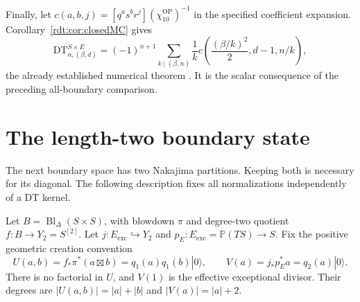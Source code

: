 Finally, let
$c(a,b,j)=[q^as^br^j](\chi_{10}^{\mathrm{OP}})^{-1}$ in the
specified coefficient expansion. Corollary~\ref{rdt:cor:closedMC}
gives
\[
 \mathrm{DT}^{S\times E}_{n,(\beta,d)}
 =(-1)^{n+1}\sum_{k\mid(\beta,n)}\frac1k
        c\left(\frac{(\beta/k)^2}{2},d-1,n/k\right),
\]
the already established numerical theorem
\cite[Theorem 1.3]{OberdieckMC}. It is the scalar consequence of
the preceding all-boundary comparison.

\section{The length-two boundary state}
\label{rdt:sec:Hilb2}

The next boundary space has two Nakajima partitions. Keeping both
is necessary for its diagonal. The following description fixes all
normalizations independently of a DT kernel.

Let $B=\operatorname{Bl}_\Delta(S\times S)$, with blowdown $\pi$ and degree-two
quotient $f:B\to Y_2=S^{[2]}$. Let
$j:E_{\mathrm{exc}}\hookrightarrow Y_2$ and
$p_E:E_{\mathrm{exc}}=\mathbb P(TS)\to S$. Fix the positive
geometric creation convention
\[
 U(a,b)=f_*\pi^*(a\boxtimes b)=q_1(a)q_1(b)|0\rangle,
 \qquad V(a)=j_*p_E^*a=q_2(a)|0\rangle.
\]
There is no factorial in $U$, and $V(1)$ is the effective exceptional
divisor. Their degrees are $|U(a,b)|=|a|+|b|$ and
$|V(a)|=|a|+2$.

